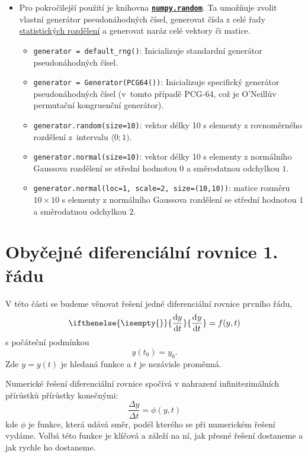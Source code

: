 \documentclass[a4paper,11pt,twoside]{article}
\renewcommand{\d}{\mathrm{d}}
\newcommand{\derivative}[3][]{\ifthenelse{\isempty{#1}}	    %
	{\frac{\d{#2}}{\d{#3}}}
	{\frac{\d^{#1}{#2}}{\d{#3}^{#1}}}
}
\def\code#1{\textnormal{\texttt{#1}}}
\def\file#1{\textnormal{\textbf{\texttt{#1}}}}
\theoremstyle{red}
\theoremstyle{green}
\begin{document}
\begin{itemize}
        \item 
            Pro pokročilejší použití je knihovna \file{\href{https://numpy.org/doc/stable/reference/random/index.html}{numpy.random}}.
            Ta umožňuje zvolit vlastní generátor pseudonáhodných čísel, generovat čísla z celé řady \href{https://numpy.org/doc/stable/reference/random/generator.html}{statistických rozdělení} a generovat naráz celé vektory či matice.
            \begin{itemize}
                \item \code{generator = default_rng()}: Inicializuje standardní generátor pseudonáhodných čísel.
                \item \code{generator = Generator(PCG64())}: Inicializuje specifický generátor pseudonáhodných čísel (v~tomto případě PCG-64, což je O'Neillův permutační kongruenční generátor).
                \item \code{generator.random(size=10)}: vektor délky 10 s elementy z rovnoměrného rozdělení z~intervalu $\langle 0;1)$.
                \item \code{generator.normal(size=10)}: vektor délky 10 s elementy z normálního Gaussova rozdělení se střední hodnotou $0$ a směrodatnou odchylkou $1$.
                \item \code{generator.normal(loc=1, scale=2, size=(10,10))}: matice rozměru $10\times10$ s elementy z normálního Gaussova rozdělení se střední hodnotou $1$ a směrodatnou odchylkou $2$.
            \end{itemize}            
    \end{itemize}


\section{Obyčejné diferenciální rovnice 1. řádu}
\label{sec:ODR1}
    V této části se budeme věnovat řešení jedné diferenciální rovnice prvního řádu,
    \begin{equation}
        \derivative{y}{t}=f(y,t)
    \end{equation}
    s počáteční podmínkou
    \begin{equation}
        y(t_{0})=y_{0}.
    \end{equation}
    Zde $y=y(t)$ je hledaná funkce a $t$ je nezávisle proměnná.
    
    Numerické řešení diferenciální rovnice spočívá v nahrazení infinitezimálních přírůstků přírůstky konečnými:
    \begin{equation}\label{eq:Diference}
        \frac{\Delta y}{\Delta t}=\phi(y,t)
    \end{equation}
    kde $\phi$ je funkce, která udává směr, podél kterého se při numerickém řešení vydáme.
    Volbá této funkce je klíčová a záleží na ní, jak přesné řešení dostaneme a jak rychle ho dostaneme.
\end{document}
